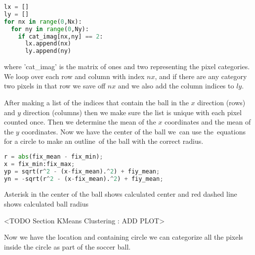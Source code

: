 \begin{lstlisting}[language=Python]
lx = []
ly = []
for nx in range(0,Nx):
  for ny in range(0,Ny):
    if cat_imag[nx,ny] == 2:
      lx.append(nx)
      ly.append(ny)
\end{lstlisting}

where 'cat\_imag' is the matrix of ones and two representing the pixel categories. We loop over each row and column with index $nx$, and if there are any category two pixels in that row we save off $nx$ and we also add the column indices to $ly$.

After making a list of the indices that contain the ball in the $x$ direction (rows) and $y$ direction (columns) then we make sure the list is unique with each pixel counted once. Then we determine the mean of the $x$ coordinates and the mean of the $y$ coordinates. Now we have the center of the ball we can use the equations for a circle to make an outline of the ball with the correct radius.

\begin{lstlisting}[language=Python]
r = abs(fix_mean - fix_min);
x = fix_min:fix_max;
yp = sqrt(r^2 - (x-fix_mean).^2) + fiy_mean;
yn = -sqrt(r^2 - (x-fix_mean).^2) + fiy_mean;
\end{lstlisting}

Asterisk in the center of the ball shows calculated center and red dashed line shows calculated ball radius

<TODO Section KMeans Clustering : ADD PLOT>

Now we have the location and containing circle we can categorize all the pixels inside the circle as part of the soccer ball.
